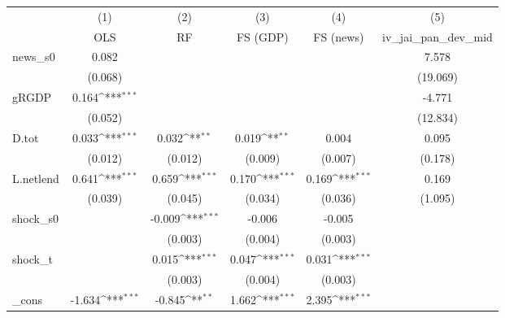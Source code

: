 {
\def\sym#1{\ifmmode^{#1}\else\(^{#1}\)\fi}
\begin{tabular}{l*{5}{c}}
\toprule
            &\multicolumn{1}{c}{(1)}&\multicolumn{1}{c}{(2)}&\multicolumn{1}{c}{(3)}&\multicolumn{1}{c}{(4)}&\multicolumn{1}{c}{(5)}\\
            &\multicolumn{1}{c}{OLS}&\multicolumn{1}{c}{RF}&\multicolumn{1}{c}{FS (GDP)}&\multicolumn{1}{c}{FS (news)}&\multicolumn{1}{c}{iv\_jai\_pan\_dev\_mid}\\
\midrule
news\_s0     &       0.082         &                     &                     &                     &       7.578         \\
            &     (0.068)         &                     &                     &                     &    (19.069)         \\
\addlinespace
gRGDP       &       0.164\sym{***}&                     &                     &                     &      -4.771         \\
            &     (0.052)         &                     &                     &                     &    (12.834)         \\
\addlinespace
D.tot       &       0.033\sym{***}&       0.032\sym{**} &       0.019\sym{**} &       0.004         &       0.095         \\
            &     (0.012)         &     (0.012)         &     (0.009)         &     (0.007)         &     (0.178)         \\
\addlinespace
L.netlend   &       0.641\sym{***}&       0.659\sym{***}&       0.170\sym{***}&       0.169\sym{***}&       0.169         \\
            &     (0.039)         &     (0.045)         &     (0.034)         &     (0.036)         &     (1.095)         \\
\addlinespace
shock\_s0    &                     &      -0.009\sym{***}&      -0.006         &      -0.005         &                     \\
            &                     &     (0.003)         &     (0.004)         &     (0.003)         &                     \\
\addlinespace
shock\_t     &                     &       0.015\sym{***}&       0.047\sym{***}&       0.031\sym{***}&                     \\
            &                     &     (0.003)         &     (0.004)         &     (0.003)         &                     \\
\addlinespace
\_cons      &      -1.634\sym{***}&      -0.845\sym{**} &       1.662\sym{***}&       2.395\sym{***}&                     \\

\end{tabular}}
